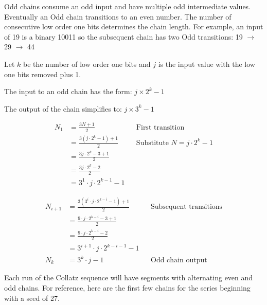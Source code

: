 \documentclass[letterpaper]{article}
\begin{document}
\begin{multicols}{2}
    Odd chains consume an odd input and have multiple odd intermediate values. Eventually an Odd chain transitions to an even number. The number of consecutive low order one bits determines the chain length. For example, an input of 19 is a binary 10011 so the subsequent chain has two Odd transitions: 19 $\to$ 29 $\to$ 44

    Let \( k \) be the number of low order one bits and \( j \) is the input value with the low one bits removed plus 1.

    The input to an odd chain has the form: \( j \times 2^k - 1 \)

    The output of the chain simplifies to: \( j \times 3^k - 1 \)

    \begin{align*}
        N_1 & = \frac{3N + 1}{2}                 &  & \text{First transition}                \\
            & = \frac{3(j \cdot 2^k - 1) + 1}{2} &  & \text{Substitute } N = j \cdot 2^k - 1 \\
            & = \frac{3j \cdot 2^k - 3 + 1}{2}                                               \\
            & = \frac{3j \cdot 2^k - 2}{2}                                                   \\
            & = 3^1 \cdot j \cdot 2^{k-1} - 1
    \end{align*}

    \begin{align*}
        N_{i+1} & = \frac{3 \left(3^i \cdot j \cdot 2^{k-i} - 1\right) + 1}{2} &  & \text{Subsequent transitions} \\
                & = \frac{9 \cdot j \cdot 2^{k-i} - 3 + 1}{2}                                                     \\
                & = \frac{9 \cdot j \cdot 2^{k-i} - 2}{2}                                                         \\
                & = 3^{i+1} \cdot j \cdot 2^{k-i-1} - 1                                                           \\
        N_k     & = 3^k \cdot j - 1                                            &  & \text{Odd chain output}
    \end{align*}

    Each run of the Collatz sequence will have segments with alternating even and odd chains. For reference, here are the first few chains for the series beginning with a seed of 27.


\end{multicols}
\end{document}
